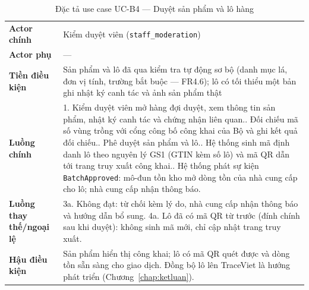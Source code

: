 \begingroup
\tblsetup
\begin{longtable}{L{3.00cm} L{12.25cm}}
\caption{Đặc tả use case UC-B4 --- Duyệt sản phẩm và lô hàng}
\label{tab:uc-b4} \\
\toprule
{}
 \\
\midrule
\endfirsthead
\bottomrule
\endfoot
\textbf{Actor chính} & Kiểm duyệt viên (\texttt{staff\_moderation}) \\
\textbf{Actor phụ} & --- \\
\textbf{Tiền điều kiện} & Sản phẩm và lô đã qua kiểm tra tự động sơ bộ (danh mục lá, đơn vị tính, trường bắt buộc --- FR4.6); lô có tối thiểu một bản ghi nhật ký canh tác và ảnh sản phẩm thật \\
\textbf{Luồng chính} &
1. Kiểm duyệt viên mở hàng đợi duyệt, xem thông tin sản phẩm, nhật ký canh tác và chứng nhận liên quan.. Đối chiếu mã số vùng trồng với cổng công bố công khai của Bộ và ghi kết quả đối chiếu.. Phê duyệt sản phẩm và lô.. Hệ thống sinh mã định danh lô theo nguyên lý GS1 (GTIN kèm số lô) và mã QR dẫn tới trang truy xuất công khai.. Hệ thống phát sự kiện \texttt{BatchApproved}: mô-đun tồn kho mở dòng tồn của nhà cung cấp cho lô; nhà cung cấp nhận thông báo. \\
\textbf{Luồng thay thế/ngoại lệ} &
3a. Không đạt: từ chối kèm lý do, nhà cung cấp nhận thông báo và hướng dẫn bổ sung.\newline
4a. Lô đã có mã QR từ trước (đính chính sau khi duyệt): không sinh mã mới, chỉ cập nhật trang truy xuất. \\
\textbf{Hậu điều kiện} & Sản phẩm hiển thị công khai; lô có mã QR quét được và dòng tồn sẵn sàng cho giao dịch. Đồng bộ lô lên TraceViet là hướng phát triển (Chương~\ref{chap:ketluan}). \\
\end{longtable}
\endgroup

